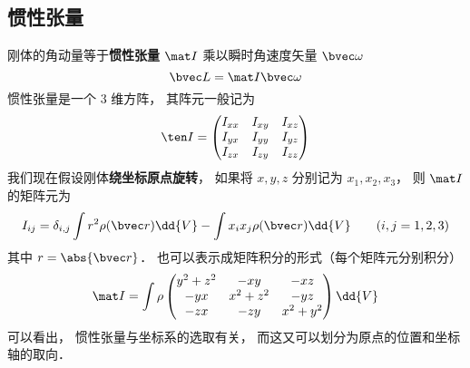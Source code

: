 \subsection{惯性张量}
刚体的角动量等于\textbf{惯性张量} $\mat I$ 乘以瞬时角速度矢量 $\bvec \omega$
\begin{equation}\label{ITensr_eq3}
\bvec L = \mat I \bvec \omega
\end{equation}
惯性张量是一个 3 维方阵， 其阵元一般记为
\begin{equation}
\ten I = \begin{pmatrix}
I_{xx}& I_{xy}& I_{xz} \\
I_{yx}& I_{yy}& I_{yz} \\
I_{zx}& I_{zy}& I_{zz}
\end{pmatrix}
\end{equation}
我们现在假设刚体\textbf{绕坐标原点旋转}， 如果将 $x, y, z$ 分别记为 $x_1, x_2, x_3$， 则 $\mat I$ 的矩阵元为
\begin{equation}\label{ITensr_eq1}
I_{ij} = \delta_{i, j} \int r^2 \rho(\bvec r)\dd{V} - \int x_i x_j \rho(\bvec r)\dd{V} \qquad (i, j = 1, 2, 3)
\end{equation}
其中 $r = \abs{\bvec r}$． 也可以表示成矩阵积分的形式（每个矩阵元分别积分）
\begin{equation}\label{ITensr_eq2}
\mat I = \int \rho
\begin{pmatrix}
y^2 + z^2 & -xy & -xz\\
-yx & x^2 + z^2 & -yz\\
-zx & -zy & x^2 + y^2
\end{pmatrix}
\dd{V}
\end{equation}
可以看出， 惯性张量与坐标系的选取有关， 而这又可以划分为原点的位置和坐标轴的取向．

